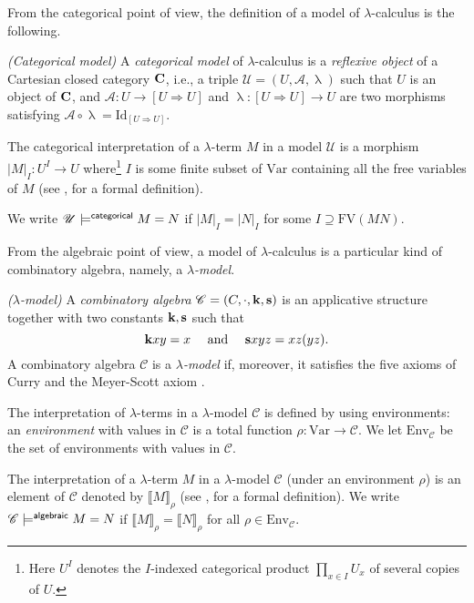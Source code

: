 \documentclass[english]{llncs}
\renewcommand{\bold}[1]{{\bf #1}}
\newcommand{\Var}{\mathrm{Var}}
\newcommand{\FV}{\mathrm{FV}}
\newcommand{\Env}{\mathrm{Env}}
\newcommand{\Id}[1]{\mathrm{Id}_{#1}}
\newcommand{\cat}[1]{\bold{#1}}
\newcommand{\Funint}[2]{[{#1}\To{#2}]}
\newcommand{\To}{\Rightarrow}
\newcommand{\lm}[1]{\mathscr{#1}} \newcommand{\Lint}[1]{\Lbrack #1\Rbrack} \newcommand{\ca}[1]{\mathscr{#1}} \newcommand{\Int}[1]{\vert #1\vert}
\newcommand{\ro}[1]{\mathscr{#1}} \newcommand{\App}{\mathcal{A}}
\newcommand{\Abs}{\uplambda}
\newcommand{\Cint}[1]{\vert {#1}\vert}
\newcommand{\alg}[1]{\mathscr{#1}} \newcommand{\CE}[1]{{\mathrm{CE}(#1)}} \newcommand{\IE}[1]{{\mathrm{IE}(#1)}} \newcommand{\class}[1]{\mathbb{#1}}
\newcommand{\comp}{\circ}
\newcommand{\gl}{\lambda}
\newcommand\ssk{{\bf k}}
\newcommand\sss{{\bf s}}
\begin{document}
From the categorical point of view, the definition of a model of $\lambda$-calculus is the following. 

\begin{definition} {\em (Categorical model)} A \emph{categorical model} of $\lambda$-calculus is a \emph{reflexive object} of a Cartesian closed category $\cat{C}$, 
i.e., a triple $\ro{U} = (U,\App,\Abs)$ such that $U$ is an object of $\cat{C}$, and  $\App:U\to\Funint UU$ and $\Abs:\Funint UU \to U$
are two morphisms satisfying $\App\comp\Abs=\Id{\Funint{U}{U}}$. 
\end{definition}

The categorical interpretation of a $\lambda$-term $M$ in a model $\ro{U}$ is a morphism $\Cint{M}_I:U^I\to U$ where\footnote{
Here $U^I$ denotes the $I$-indexed categorical product $\prod_{x\in I} U_x$ of several copies of $U$.
} $I$ is some finite subset of $\Var$
containing all the free variables of $M$ (see \cite[Def.~5.5.3(vii)]{Bare}, for a formal definition). 

We write $\ro{U}\models^{\sf categorical} M = N$ if $\Cint{M}_I = \Cint{N}_I$ for some $I\supseteq\FV(MN)$.

From the algebraic point of view, a model of $\lambda$-calculus is a particular kind of combinatory algebra, namely, a {\em $\lambda$-model}.

\begin{definition} 
{\em ($\gl$-model)} A \emph{combinatory algebra} $\ca{C} = (C, \cdot, \ssk, \sss)$ is an applicative structure together with two constants
$\ssk,\sss$ such that 
$$
    \textrm{$\ssk xy=x\quad$ and $\quad\sss xyz=xz(yz)$.}
$$
A combinatory algebra $\ca{C}$ is a {\em $\gl$-model} if, moreover, it satisfies the five axioms of Curry \cite[Thm.~5.2.5]{Bare} and the Meyer-Scott axiom \cite[Def.~5.2.7(ii)]{Bare}.
\end{definition}

The interpretation of $\gl$-terms in a $\gl$-model $\lm{C}$ is defined by using environments:
an {\em environment} with values in $\lm{C}$ is a total function $\rho:\Var\rightarrow\alg{C}$.
We let $\Env_\alg{C}$ be the set of environments with values in $\alg{C}$.

The interpretation of a $\gl$-term $M$ in a $\gl$-model $\lm{C}$ (under an environment $\rho$) is an element of $\lm{C}$ denoted by $\Lint{M}_\rho$ (see \cite[Def.~5.2.1(ii)]{Bare}, for a formal definition).
We write $\ro{C}\models^{\sf algebraic} M = N$ if $\Lint{M}_\rho = \Lint{N}_\rho$ for all $\rho\in\Env_\alg{C}$.
\end{document}
